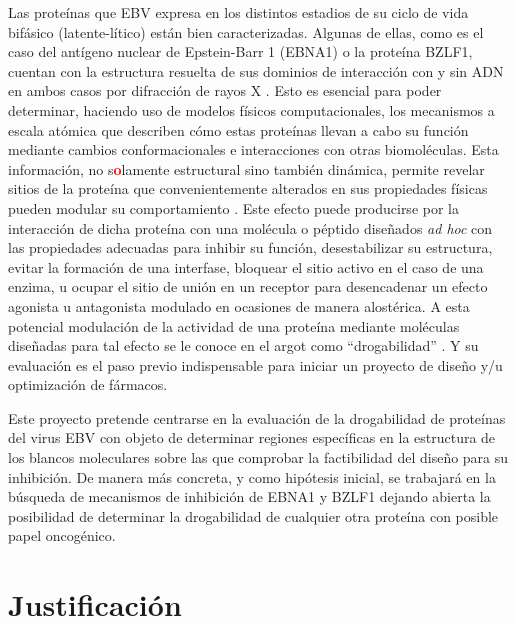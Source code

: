 \documentclass[12pt,letterpaper]{article} %
\newcommand{\red}[1]{\textcolor{red}{\textbf{#1}}}
\newcommand{\tout}[1]{\red{\textst{#1}}}
\begin{document}
Las proteínas que EBV expresa en los distintos estadios de su ciclo de vida
bifásico (latente-lítico) están bien caracterizadas. Algunas de ellas, como es
el caso del antígeno nuclear de Epstein-Barr 1 (EBNA1) o la proteína BZLF1,
cuentan con la estructura resuelta de sus dominios de interacción con y sin
  ADN en ambos casos por difracción de rayos X 
  \red{\cite{Bochkarev1995,Bochkarev1996c,Petosa2006}}. \tout{Esta
  informaci\'on} Esto es
esencial para poder determinar, haciendo uso de modelos físicos computacionales,
los mecanismos a escala atómica que describen cómo estas proteínas llevan a cabo
su función mediante cambios conformacionales e interacciones con otras
biomoléculas. Esta información, no s\red{o}lamente estructural sino también
dinámica, permite revelar sitios de la proteína que convenientemente alterados
en sus propiedades físicas pueden modular su comportamiento
\cite{Shirts2010a,Mortier2015}. Este efecto puede producirse por la
interacción de dicha proteína con una molécula o péptido diseñados \emph{ad hoc}
con las propiedades adecuadas para inhibir su función, desestabilizar su
estructura, evitar la formación de una interfase, bloquear el sitio activo en el
caso de una enzima, u ocupar el sitio de unión en un receptor para desencadenar
un efecto agonista u antagonista modulado en ocasiones de manera alostérica. A
esta potencial modulación de la actividad de una proteína mediante moléculas
diseñadas para tal efecto se le conoce en el argot como ``drogabilidad'' \red{\cite{Barril2013}}. Y su
evaluación es el paso previo indispensable para iniciar un proyecto de diseño
y/u optimización de fármacos.

Este proyecto pretende centrarse en la evaluación de la drogabilidad de
proteínas del virus EBV con objeto de determinar regiones específicas en la
estructura de los blancos moleculares sobre las que comprobar la factibilidad del
diseño para su inhibición. De manera más concreta, y como hipótesis inicial, se
trabajará en la búsqueda de mecanismos de inhibición de EBNA1 y BZLF1 dejando
abierta la posibilidad de determinar la drogabilidad de cualquier otra proteína
con posible papel oncogénico.


\section{Justificación}
\end{document}
